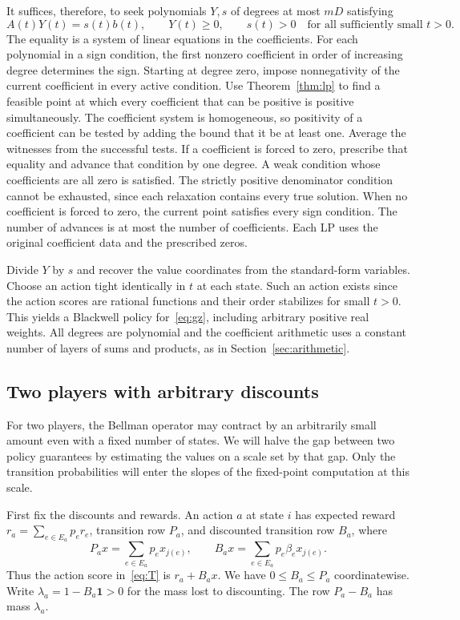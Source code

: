 It suffices, therefore, to seek polynomials \(Y,s\) of degrees at most
\(mD\) satisfying
\[
       A(t)Y(t)=s(t)b(t),\qquad Y(t)\ge0,\qquad s(t)>0
       \quad\text{for all sufficiently small }t>0 .
\]
The equality is a system of linear equations in the coefficients.
For each polynomial in a sign condition, the first nonzero coefficient
in order of increasing degree determines the sign. Starting at degree
zero, impose nonnegativity of the current coefficient in every active
condition. Use Theorem~\ref{thm:lp} to find a feasible point at which
every coefficient that can be positive is positive simultaneously.
The coefficient system is homogeneous, so positivity of a coefficient
can be tested by adding the bound that it be at least one. Average the
witnesses from the successful tests. If a coefficient is forced to zero, prescribe that
equality and advance that condition by one degree. A weak condition
whose coefficients are all zero is satisfied. The strictly positive
denominator condition cannot be exhausted, since each relaxation
contains every true solution. When no coefficient is forced to zero,
the current point satisfies every sign condition. The number of
advances is at most the number of coefficients. Each LP uses the
original coefficient data and the prescribed zeros.

Divide \(Y\) by \(s\) and recover the value coordinates from the
standard-form variables. Choose an action tight identically in \(t\)
at each state. Such an action exists since the action scores are
rational functions and their order stabilizes for small \(t>0\).
This yields a Blackwell policy for~\eqref{eq:gz}, including arbitrary
positive real weights. All degrees are polynomial and the coefficient
arithmetic uses a constant number of layers of sums and products, as
in Section~\ref{sec:arithmetic}.

\subsection{Two players with arbitrary discounts}
\label{sec:longdiscounts}

For two players, the Bellman operator may contract by an arbitrarily
small amount even with a fixed number of states. We will halve the gap
between two policy guarantees by estimating the values on a scale set
by that gap. Only the transition probabilities will enter the slopes
of the fixed-point computation at this scale.

First fix the discounts and rewards. An action \(a\) at state \(i\)
has expected reward \(r_a=\sum_{e\in E_a} p_e r_e\), transition row
\(P_a\), and discounted transition row \(B_a\), where
\[
   P_a x=\sum_{e\in E_a}p_e x_{j(e)},\qquad
   B_a x=\sum_{e\in E_a}p_e\beta_e x_{j(e)} .
\]
Thus the action score in~\eqref{eq:T} is \(r_a+B_a x\). We have
\(0\le B_a\le P_a\) coordinatewise. Write
\(\lambda_a=1-B_a\mathbf1>0\) for the mass lost to discounting.
The row \(P_a-B_a\) has mass \(\lambda_a\).

